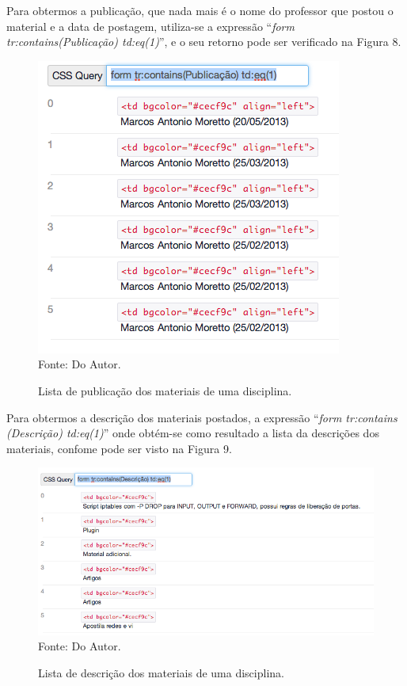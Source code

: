 Para obtermos a publicação, que nada mais é o nome do professor que postou o material e a data de postagem, utiliza-se a expressão ``\emph{form tr:contains(Publicação) td:eq(1)}'', e o seu retorno pode ser verificado na Figura 8.

\begin{figure}[!htb]
     \centering     
     \caption[Extração de Informações - Lista das publicações dos materiais]{Lista de publicação dos materiais de uma disciplina.}
     \includegraphics[scale=0.7]{imagens/listamateriaisdisciplinaspublicacao.png}
     \\  Fonte: Do Autor.
\end{figure}

Para obtermos a descrição dos materiais postados, a expressão ``\emph{form tr:contains\\(Descrição) td:eq(1)}'' onde obtém-se como resultado a lista da descrições dos materiais, confome pode ser visto na Figura 9.

\begin{figure}[!htb]
     \centering
     \caption[Extração de Informações - Lista das descrições dos materiais]{Lista de descrição dos materiais de uma disciplina.}
     \includegraphics[scale=0.6]{imagens/listamateriaisdisciplinasdescricao.png}
     \\  Fonte: Do Autor.
\end{figure}

